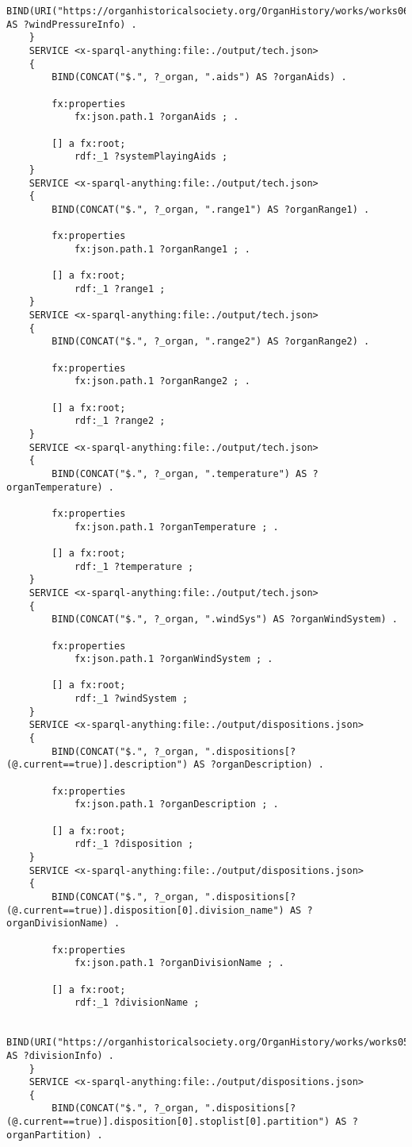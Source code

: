 \begin{lstlisting}[caption={organ-details.sparql}]
		BIND(URI("https://organhistoricalsociety.org/OrganHistory/works/works06.htm") AS ?windPressureInfo) .
	} 
	SERVICE <x-sparql-anything:file:./output/tech.json>
	{
		BIND(CONCAT("$.", ?_organ, ".aids") AS ?organAids) .

		fx:properties
			fx:json.path.1 ?organAids ; .

		[] a fx:root; 
			rdf:_1 ?systemPlayingAids ;
	} 
	SERVICE <x-sparql-anything:file:./output/tech.json>
	{
		BIND(CONCAT("$.", ?_organ, ".range1") AS ?organRange1) .

		fx:properties
			fx:json.path.1 ?organRange1 ; .

		[] a fx:root; 
			rdf:_1 ?range1 ;
	} 
	SERVICE <x-sparql-anything:file:./output/tech.json>
	{
		BIND(CONCAT("$.", ?_organ, ".range2") AS ?organRange2) .

		fx:properties
			fx:json.path.1 ?organRange2 ; .

		[] a fx:root; 
			rdf:_1 ?range2 ;
	} 
	SERVICE <x-sparql-anything:file:./output/tech.json>
	{
		BIND(CONCAT("$.", ?_organ, ".temperature") AS ?organTemperature) .

		fx:properties
			fx:json.path.1 ?organTemperature ; .

		[] a fx:root; 
			rdf:_1 ?temperature ;
	} 
	SERVICE <x-sparql-anything:file:./output/tech.json>
	{
		BIND(CONCAT("$.", ?_organ, ".windSys") AS ?organWindSystem) .

		fx:properties
			fx:json.path.1 ?organWindSystem ; .

		[] a fx:root; 
			rdf:_1 ?windSystem ;
	} 
	SERVICE <x-sparql-anything:file:./output/dispositions.json>
	{
		BIND(CONCAT("$.", ?_organ, ".dispositions[?(@.current==true)].description") AS ?organDescription) .

		fx:properties
			fx:json.path.1 ?organDescription ; .

		[] a fx:root; 
			rdf:_1 ?disposition ;
	} 
	SERVICE <x-sparql-anything:file:./output/dispositions.json>
	{
		BIND(CONCAT("$.", ?_organ, ".dispositions[?(@.current==true)].disposition[0].division_name") AS ?organDivisionName) .

		fx:properties
			fx:json.path.1 ?organDivisionName ; .

		[] a fx:root; 
			rdf:_1 ?divisionName ;

		BIND(URI("https://organhistoricalsociety.org/OrganHistory/works/works05.htm") AS ?divisionInfo) .
	} 
	SERVICE <x-sparql-anything:file:./output/dispositions.json>
	{
		BIND(CONCAT("$.", ?_organ, ".dispositions[?(@.current==true)].disposition[0].stoplist[0].partition") AS ?organPartition) .


\end{lstlisting}
